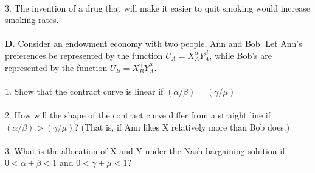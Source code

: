 \documentclass[11pt]{article}
\begin{document}
\\
3. The invention of a drug that will make it easier to quit smoking would increase smoking rates.\\
\\
\textbf{D.} Consider an endowment economy with two people, Ann and Bob. Let Ann's preferences be represented by the function $U_A = X_A^\alpha Y_A^\beta$, while Bob's are represented by the function $U_B = X_B^\gamma Y_A^\mu$.\\
\\
1. Show that the contract curve is linear if $(\alpha /\beta) = (\gamma /\mu)$\\
\\
2. How will the shape of the contract curve differ from a straight line if $(\alpha /\beta) > (\gamma /\mu)$? (That is, if Ann likes X relatively more than Bob does.)\\
\\
3. What is the allocation of X and Y under the Nash bargaining solution if $0 < \alpha + \beta < 1$ and $0 < \gamma + \mu < 1$?
\end{document}

